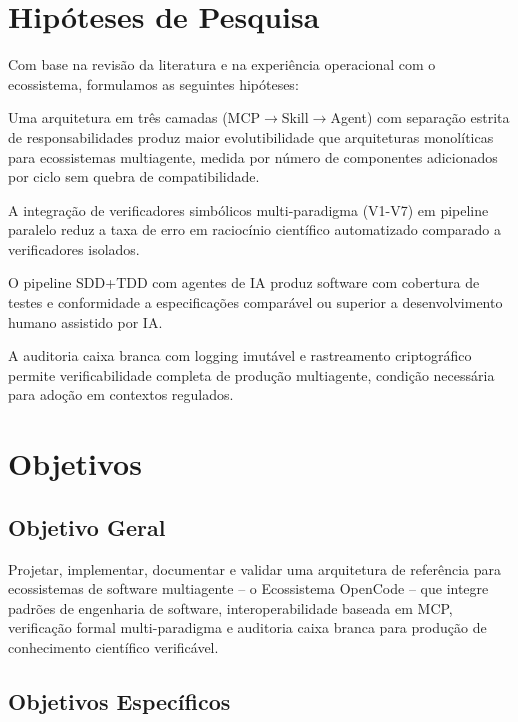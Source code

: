 \documentclass[12pt,a4paper,sumario=tradicional]{abntex2}
\begin{document}
\section{Hipóteses de Pesquisa}

Com base na revisão da literatura e na experiência operacional com o ecossistema, formulamos as seguintes hipóteses:

\begin{description}[style=nextline,leftmargin=2cm]
    \item[H1:] Uma arquitetura em três camadas (MCP$\rightarrow$Skill$\rightarrow$Agent) com separação estrita de responsabilidades produz maior evolutibilidade que arquiteturas monolíticas para ecossistemas multiagente, medida por número de componentes adicionados por ciclo sem quebra de compatibilidade.
    \item[H2:] A integração de verificadores simbólicos multi-paradigma (V1-V7) em pipeline paralelo reduz a taxa de erro em raciocínio científico automatizado comparado a verificadores isolados.
    \item[H3:] O pipeline SDD+TDD com agentes de IA produz software com cobertura de testes e conformidade a especificações comparável ou superior a desenvolvimento humano assistido por IA.
    \item[H4:] A auditoria caixa branca com logging imutável e rastreamento criptográfico permite verificabilidade completa de produção multiagente, condição necessária para adoção em contextos regulados.
\end{description}

\section{Objetivos}

\subsection{Objetivo Geral}

Projetar, implementar, documentar e validar uma arquitetura de referência para ecossistemas de software multiagente -- o Ecossistema OpenCode -- que integre padrões de engenharia de software, interoperabilidade baseada em MCP, verificação formal multi-paradigma e auditoria caixa branca para produção de conhecimento científico verificável.

\subsection{Objetivos Específicos}
\end{document}
